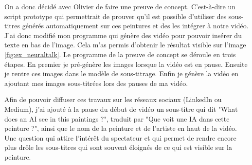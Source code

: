 \par
On a donc décidé avec Olivier de faire une preuve de concept. C'est-à-dire un script prototype qui permettrait de prouver qu'il est possible d'utiliser des sous-titres générés automatiquement sur ces peintures et des les intégrer à notre vidéo. J'ai donc modifié mon programme qui génère des vidéo pour pouvoir insérer du texte en bas de l'image. Cela m'as permis d'obtenir le résultat visible sur l'image \ref{fig:ex_neuraltalk}. Le programme de la preuve de concept se déroule en trois étapes. En premier je pré-génère les images lorsque la vidéo est en pause. Ensuite je rentre ces images dans le modèle de sous-titrage. Enfin je génère la vidéo en ajoutant mes images sous-titrées lors des pauses de ma vidéo.

\par
Afin de pouvoir diffuser ces travaux sur les réseaux sociaux (LinkedIn ou Medium), j'ai ajouté à la pause du début de vidéo un sous-titre qui dit "What does an AI see in this paintings ?", traduit par "Que voit une IA dans cette peinture ?", ainsi que le nom de la peinture et de l'artiste en haut de la vidéo. Une question qui attire l'intérêt du spectateur et qui permet de rendre encore plus drôle les sous-titres qui sont souvent éloignés de ce qui est visible sur la peinture.


